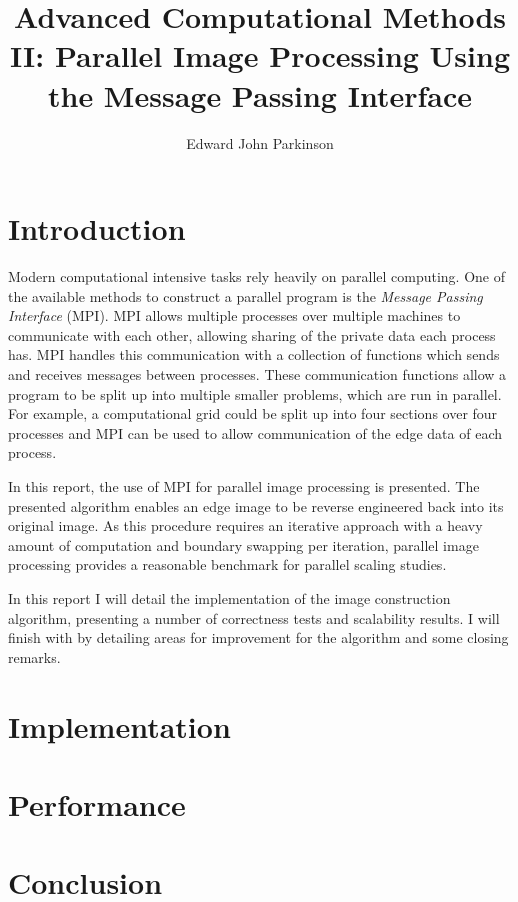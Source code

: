 \documentclass[11pt, a4paper]{article}
\begin{document}
	\title{Advanced Computational Methods II: Parallel Image Processing Using the Message Passing Interface}
	\author{Edward John Parkinson}
	\maketitle	
	
	\section{Introduction}
		Modern computational intensive tasks rely heavily on parallel computing. One of the available methods to construct a parallel program is the \textit{Message Passing Interface} (MPI). MPI allows multiple processes over multiple machines to communicate with each other, allowing sharing of the private data each process has. MPI handles this communication with a collection of functions which sends and receives messages between processes. These communication functions allow a program to be split up into multiple smaller problems, which are run in parallel. For example, a computational grid could be split up into four sections over four processes and MPI can be used to allow communication of the edge data of each process. 
		
		In this report, the use of MPI for parallel image processing is presented. The presented algorithm enables an edge image to be reverse engineered back into its original image. As this procedure requires an iterative approach with a heavy amount of computation and boundary swapping per iteration, parallel image processing provides a reasonable benchmark for parallel scaling studies.
		
		In this report I will detail the implementation of the image construction algorithm, presenting a number of correctness tests and scalability results. I will finish with by detailing areas for improvement for the algorithm and some closing remarks.
	
	\section{Implementation}
	
	\section{Performance}
	
	\section{Conclusion}
		
\end{document}
